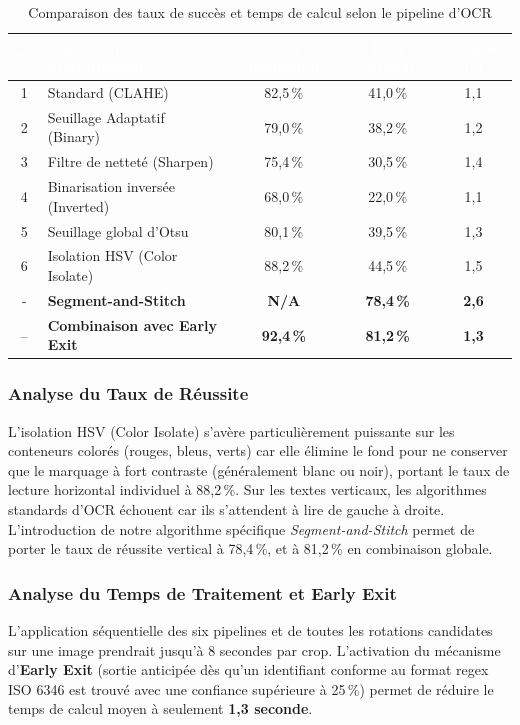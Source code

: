 \documentclass[12pt,a4paper]{article}
\begin{document}
\begin{table}[H]
\centering
\caption{Comparaison des taux de succès et temps de calcul selon le pipeline d'OCR}
\begin{tabular}{|c|l|c|c|c|}
\hline
\rowcolor{TableHeader}\textcolor{white}{\textbf{N°}} & \textcolor{white}{\textbf{Pipeline de prétraitement}} & \textcolor{white}{\textbf{Taux horizontal}} & \textcolor{white}{\textbf{Taux vertical}} & \textcolor{white}{\textbf{Temps (s)}} \\ \hline
1 & Standard (CLAHE) & 82,5\,\% & 41,0\,\% & 1,1 \\ \hline
2 & Seuillage Adaptatif (Binary) & 79,0\,\% & 38,2\,\% & 1,2 \\ \hline
3 & Filtre de netteté (Sharpen) & 75,4\,\% & 30,5\,\% & 1,4 \\ \hline
4 & Binarisation inversée (Inverted) & 68,0\,\% & 22,0\,\% & 1,1 \\ \hline
5 & Seuillage global d'Otsu & 80,1\,\% & 39,5\,\% & 1,3 \\ \hline
6 & Isolation HSV (Color Isolate) & 88,2\,\% & 44,5\,\% & 1,5 \\ \hline
- & \textbf{Segment-and-Stitch} & \textbf{N/A} & \textbf{78,4\,\%} & \textbf{2,6} \\ \hline
-- & \textbf{Combinaison avec Early Exit} & \textbf{92,4\,\%} & \textbf{81,2\,\%} & \textbf{1,3} \\ \hline
\end{tabular}
\label{tab:ocr_pipeline_comp}
\end{table}

\subsubsection{Analyse du Taux de Réussite}
L'isolation HSV (Color Isolate) s'avère particulièrement puissante sur les conteneurs colorés (rouges, bleus, verts) car elle élimine le fond pour ne conserver que le marquage à fort contraste (généralement blanc ou noir), portant le taux de lecture horizontal individuel à 88,2\,\%.
Sur les textes verticaux, les algorithmes standards d'OCR échouent car ils s'attendent à lire de gauche à droite. L'introduction de notre algorithme spécifique \textit{Segment-and-Stitch} permet de porter le taux de réussite vertical à 78,4\,\%, et à 81,2\,\% en combinaison globale.

\subsubsection{Analyse du Temps de Traitement et Early Exit}
L'application séquentielle des six pipelines et de toutes les rotations candidates sur une image prendrait jusqu'à 8 secondes par crop. L'activation du mécanisme d'\textbf{Early Exit} (sortie anticipée dès qu'un identifiant conforme au format regex ISO 6346 est trouvé avec une confiance supérieure à 25\,\%) permet de réduire le temps de calcul moyen à seulement \textbf{1,3 seconde}.
\end{document}
